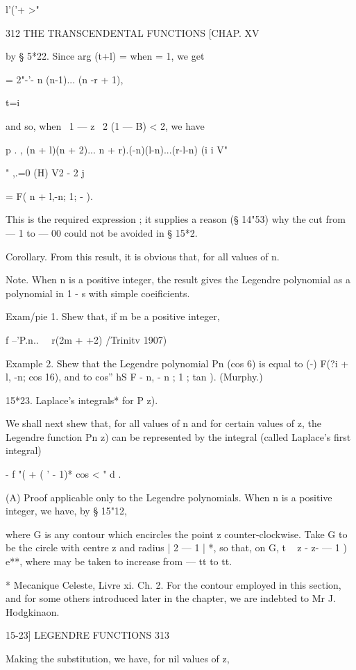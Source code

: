 {{l'('+ >"

312 THE TRANSCENDENTAL FUNCTIONS [CHAP. XV

by § 5*22. Since arg (t+l) = when = 1, we get

= 2"-'- n (n-1)... (n -r + 1),

t=i

and so, when \ 1 — z \ 2 (1 — B) < 2, we have

p . , (n + l)(n + 2)... n + r).(-n)(l-n)...(r-l-n) (i i V"

   " ,.=0 (H) V2 - 2 j

= F( n + l,-n; 1; - ).

This is the required expression ; it supplies a reason (§ 14"53) why
the cut from — 1 to — 00 could not be avoided in § 15*2.

Corollary. From this result, it is obvious that, for all values of n.

Note. When n is a positive integer, the result gives the Legendre
polynomial as a polynomial in 1 - s with simple coeificients.

Exam/pie 1. Shew that, if m be a positive integer,

f --'P.n.. \ \ r(2m + +2) /Trinitv 1907)

Example 2. Shew that the Legendre polynomial Pn (cos 6) is equal to
(-) F(?i + l, -n; \; cos 16), and to cos'' hS F - n, - n ; 1 ; tan ).
(Murphy.)

15*23. Laplace's integrals* for P z).

We shall next shew that, for all values of n and for certain values of
z, the Legendre function Pn z) can be represented by the integral
(called Laplace's first integral)

- f "( + ( ' - 1)* cos < " d .

(A) Proof applicable only to the Legendre polynomials. When n is a
positive integer, we have, by § 15"12,

where G is any contour which encircles the point z counter-clockwise.
Take G to be the circle with centre z and radius | 2 — 1 | *, so that,
on G, t ~ z - z- — 1 ) e**, where may be taken to increase from — tt
to tt.

* Mecanique Celeste, Livre xi. Ch. 2. For the contour employed in this
section, and for some others introduced later in the chapter, we are
indebted to Mr J. Hodgkinaon.

15-23] LEGENDRE FUNCTIONS 313

Making the substitution, we have, for nil values of z,

}}
